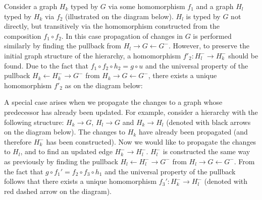 \begin{enumerate}
\begin{center}
\end{center}

Consider a graph $H_k$ typed by $G$ via some homomorphism $f_1$ and a graph $H_l$ typed by $H_k$ via $f_2$ (illustrated on the diagram below). $H_l$ is typed by $G$ not directly, but transitively via the homomorphism constructed from the composition $f_1 \circ f_2$. In this case propagation of changes in $G$ is performed similarly by finding the pullback from $H_l \rightarrow G \leftarrow G^-$. However, to preserve the initial graph structure of the hierarchy, a homomorphism $f'_2: H_l^- \rightarrow H_k^-$ should be found. Due to the fact that $f_1 \circ f_2 \circ h_2 = g \circ u$ and the universal property of the pullback $H_k \leftarrow H_k^- \rightarrow G^-$ from $H_k \rightarrow G \leftarrow G^-$, there exists a unique homomorphism $f'_2$ as on the diagram below:

\vspace{-20pt}
\begin{center}
\end{center}
\vspace{-20pt}

A special case arises when we propagate the changes to a graph whose predecessor has already been updated. For example, consider a hierarchy with the following structure: $H_k \rightarrow G$, $H_l \rightarrow G$ and $H_k \rightarrow H_l$ (denoted with black arrows on the diagram below). The changes to $H_k$ have already been propagated (and therefore $H_k^-$ has been constructed). Now we would like to propagate the changes to $H_l$, and to find an updated edge $H_k^- \rightarrow H_l^-$. $H_l^-$ is constructed the same way as previously by finding the pullback $H_l \leftarrow H_l^- \rightarrow G^-$ from $H_l \rightarrow G \leftarrow G^-$. From the fact that $g \circ f_1'= f_2 \circ f_3 \circ h_1$ and the universal property of the pullback follows that there exists a unique homomorphism $f_3': H_k^- \rightarrow H_l^-$ (denoted with red dashed arrow on the diagram).


\end{enumerate}
